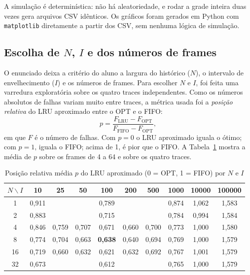 \documentclass[12pt]{article}
\begin{document}
A simulação é determinística: não há aleatoriedade, e rodar a grade inteira
duas vezes gera arquivos CSV idênticos. Os gráficos foram gerados em Python com
\texttt{matplotlib} diretamente a partir dos CSV, sem nenhuma lógica de
simulação.

\subsection{Escolha de $N$, $I$ e dos números de frames}\label{sec:parametros}

O enunciado deixa a critério do aluno a largura do histórico ($N$), o intervalo
de envelhecimento ($I$) e os números de frames. Para escolher $N$ e $I$, foi
feita uma varredura exploratória sobre os quatro traces independentes. Como os
números absolutos de falhas variam muito entre traces, a métrica usada foi a
\emph{posição relativa} do LRU aproximado entre o OPT e o FIFO:
\begin{equation}
  p = \frac{F_{\mathrm{LRU}} - F_{\mathrm{OPT}}}{F_{\mathrm{FIFO}} - F_{\mathrm{OPT}}},
\end{equation}
em que $F$ é o número de falhas. Com $p=0$ o LRU aproximado iguala o ótimo; com
$p=1$, iguala o FIFO; acima de 1, é pior que o FIFO. A
Tabela~\ref{tab:varredura} mostra a média de $p$ sobre os frames de 4 a 64 e
sobre os quatro traces.

\begin{table}[ht]
\centering
\caption{Posição relativa média $p$ do LRU aproximado (0 = OPT, 1 = FIFO)
  por $N$ e $I$}
\label{tab:varredura}
\small
\begin{tabular}{c|ccccccccc}
\hline
$N \backslash I$ & 10 & 25 & 50 & 100 & 200 & 500 & 1000 & 10000 & 100000 \\
\hline
1  & 0,911 &       &       & 0,789 &       &       & 0,874 & 1,062 & 1,583 \\
2  & 0,883 &       &       & 0,715 &       &       & 0,784 & 0,994 & 1,584 \\
4  & 0,846 & 0,759 & 0,707 & 0,671 & 0,660 & 0,700 & 0,773 & 1,000 & 1,580 \\
8  & 0,774 & 0,704 & 0,663 & \textbf{0,638} & 0,640 & 0,694 & 0,769 & 1,000 & 1,579 \\
16 & 0,719 & 0,660 & 0,632 & 0,621 & 0,632 & 0,692 & 0,767 & 1,001 & 1,579 \\
32 & 0,673 &       &       & 0,612 &       &       & 0,765 & 1,000 & 1,579 \\
\hline
\end{tabular}
\end{table}
\end{document}
